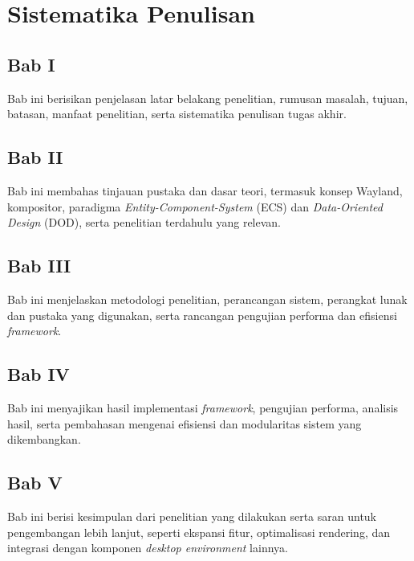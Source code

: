 \section{Sistematika Penulisan} \label{I.Sistematika}
\subsection*{Bab I}
Bab ini berisikan penjelasan latar belakang penelitian, rumusan masalah, tujuan, batasan, manfaat penelitian, serta sistematika penulisan tugas akhir. \par

\subsection*{Bab II}
Bab ini membahas tinjauan pustaka dan dasar teori, termasuk konsep Wayland, kompositor, paradigma \textit{Entity-Component-System} (ECS) dan \textit{Data-Oriented Design} (DOD), serta penelitian terdahulu yang relevan. \par

\subsection*{Bab III}
Bab ini menjelaskan metodologi penelitian, perancangan sistem, perangkat lunak dan pustaka yang digunakan, serta rancangan pengujian performa dan efisiensi \textit{framework}. \par

\subsection*{Bab IV}
Bab ini menyajikan hasil implementasi \textit{framework}, pengujian performa, analisis hasil, serta pembahasan mengenai efisiensi dan modularitas sistem yang dikembangkan. \par

\subsection*{Bab V}
Bab ini berisi kesimpulan dari penelitian yang dilakukan serta saran untuk pengembangan lebih lanjut, seperti ekspansi fitur, optimalisasi rendering, dan integrasi dengan komponen \textit{desktop environment} lainnya. \par

